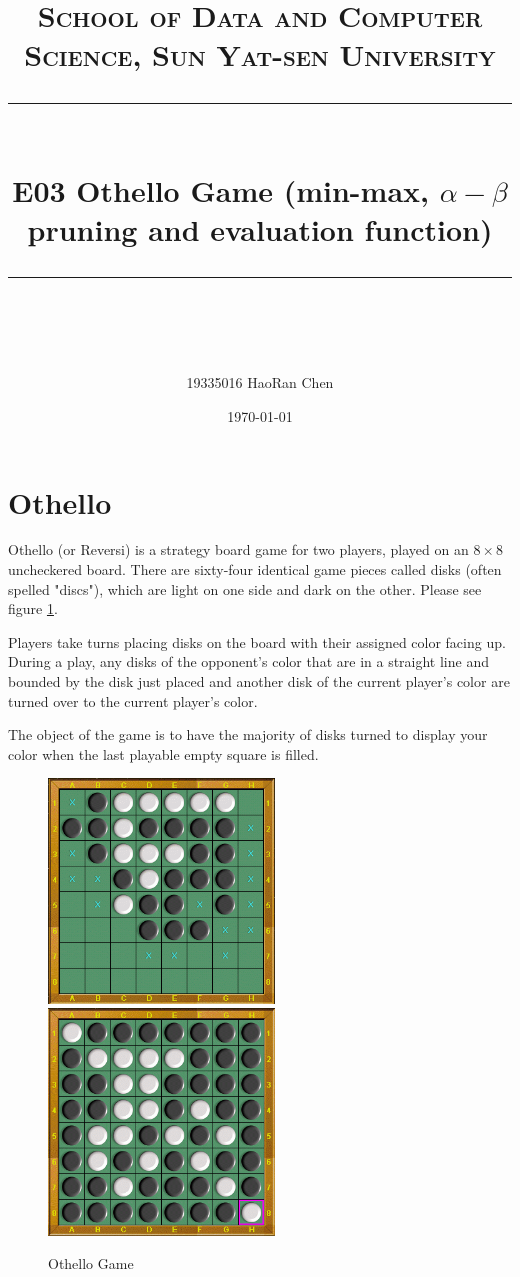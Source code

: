 \documentclass[a4paper, 11pt]{article}
\title{	
\normalfont \normalsize
\textsc{School of Data and Computer Science, Sun Yat-sen University} \\ [25pt] %
\rule{\textwidth}{0.5pt} \\[0.4cm] %
\huge  E03 Othello Game (min-max, $\alpha-\beta$ pruning and evaluation function) \\ %
\rule{\textwidth}{2pt} \\[0.5cm] %
\author{19335016 HaoRan Chen}
\date{\normalsize\today}
}
\begin{document}
\maketitle
\tableofcontents
\newpage

\section{Othello}
Othello (or Reversi) is a strategy board game for two players, played on an $8 \times 8$ uncheckered board. There are sixty-four identical game pieces called disks (often spelled "discs"), which are light on one side and dark on the other. Please see figure \ref{fig:othello}.

Players take turns placing disks on the board with their assigned color facing up. During a play, any disks of the opponent's color that are in a straight line and bounded by the disk just placed and another disk of the current player's color are turned over to the current player's color.

The object of the game is to have the majority of disks turned to display your color when the last playable empty square is filled.
\begin{figure}
  \centering
  \includegraphics[width=6cm]{Pic/othello}
  \qquad
  \includegraphics[width=6cm]{Pic/othello2}
  \caption{Othello Game}
  \label{fig:othello}
\end{figure}
\end{document}

